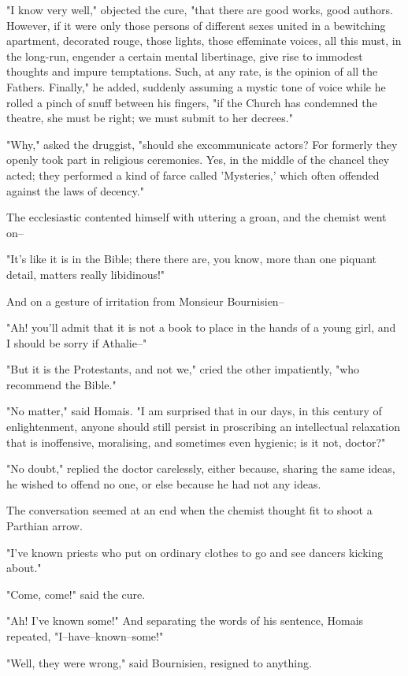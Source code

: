 \documentclass[11pt,twocolumn]{ltugboat}
\begin{document}
"I know very well," objected the cure, "that there are good works,
good authors. However, if it were only those persons of different sexes
united in a bewitching apartment, decorated rouge, those lights, those
effeminate voices, all this must, in the long-run, engender a
certain mental libertinage, give rise to immodest thoughts and impure
temptations. Such, at any rate, is the opinion of all the Fathers.
Finally," he added, suddenly assuming a mystic tone of voice while
he rolled a pinch of snuff between his fingers, "if the Church has
condemned the theatre, she must be right; we must submit to her
decrees."

"Why," asked the druggist, "should she excommunicate actors? For
formerly they openly took part in religious ceremonies. Yes, in the
middle of the chancel they acted; they performed a kind of farce called
'Mysteries,' which often offended against the laws of decency."

The ecclesiastic contented himself with uttering a groan, and the
chemist went on--

"It's like it is in the Bible; there there are, you know, more than one
piquant detail, matters really libidinous!"

And on a gesture of irritation from Monsieur Bournisien--

"Ah! you'll admit that it is not a book to place in the hands of a young
girl, and I should be sorry if Athalie--"

"But it is the Protestants, and not we," cried the other impatiently,
"who recommend the Bible."

"No matter," said Homais. "I am surprised that in our days, in this
century of enlightenment, anyone should still persist in proscribing an
intellectual relaxation that is inoffensive, moralising, and sometimes
even hygienic; is it not, doctor?"

"No doubt," replied the doctor carelessly, either because, sharing the
same ideas, he wished to offend no one, or else because he had not any
ideas.

The conversation seemed at an end when the chemist thought fit to shoot
a Parthian arrow.

"I've known priests who put on ordinary clothes to go and see dancers
kicking about."

"Come, come!" said the cure.

"Ah! I've known some!" And separating the words of his sentence, Homais
repeated, "I--have--known--some!"

"Well, they were wrong," said Bournisien, resigned to anything.
\end{document}
